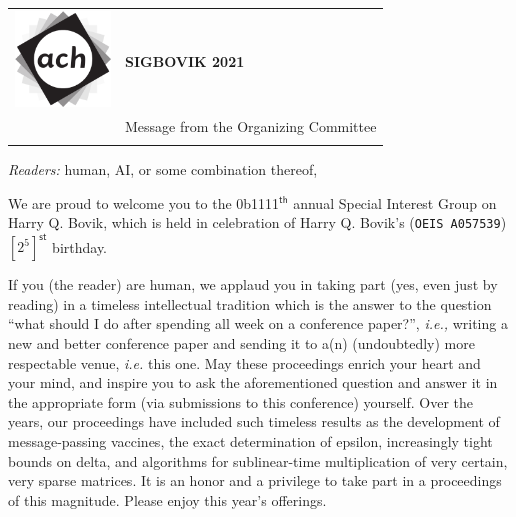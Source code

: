 \documentclass[12pt]{article}
\begin{document}
{\sffamily
\begin{tabular}{ll}
\multirow{3}{*}{\includegraphics[width=1in]{ach.png}}\\
& \textbf{\Huge{SIGBOVIK 2021}} \\ &\\
& \LARGE{Message from the Organizing Committee} \\
&\\
\hline
\end{tabular}}
\vspace{2em}
\thispagestyle{empty}

%

\emph{Readers:} human, AI, or some combination thereof,

We are proud to welcome you to the 0b1111$^\mathsf{th}$ annual Special Interest Group on Harry Q. Bovik,
which is held in celebration of Harry Q. Bovik's (\texttt{OEIS A057539})$[2^5]^\mathsf{st}$ birthday.

If you (the reader) are human, we applaud you in taking part (yes, even just by reading) in a timeless intellectual tradition which is the answer
to the question ``what should I do after spending all week on a conference paper?'', \emph{i.e.,} writing
a new and better conference paper and sending it to a(n) (undoubtedly) more respectable venue, \emph{i.e.} this one.
May these proceedings enrich your heart and your mind,
and inspire you to ask the aforementioned question and answer it in the appropriate form (via submissions to this conference) yourself.
Over the years, our proceedings have included such timeless results as the development of message-passing vaccines,
the exact determination of epsilon, increasingly tight bounds on delta, and algorithms for sublinear-time multiplication of very certain, very sparse matrices.
It is an honor and a privilege to take part in a proceedings of this magnitude. Please enjoy this year's offerings.
\end{document}
